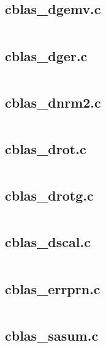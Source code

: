 \documentclass{article}
\begin{document}
\subsection{cblas\_dgemv.c}
\inputminted{c}{/home/dufferzafar/dev/@clones/scikit-learn/sklearn/src/cblas/cblas_dgemv.c}
\newpage

\subsection{cblas\_dger.c}
\inputminted{c}{/home/dufferzafar/dev/@clones/scikit-learn/sklearn/src/cblas/cblas_dger.c}
\newpage

\subsection{cblas\_dnrm2.c}
\inputminted{c}{/home/dufferzafar/dev/@clones/scikit-learn/sklearn/src/cblas/cblas_dnrm2.c}
\newpage

\subsection{cblas\_drot.c}
\inputminted{c}{/home/dufferzafar/dev/@clones/scikit-learn/sklearn/src/cblas/cblas_drot.c}
\newpage

\subsection{cblas\_drotg.c}
\inputminted{c}{/home/dufferzafar/dev/@clones/scikit-learn/sklearn/src/cblas/cblas_drotg.c}
\newpage

\subsection{cblas\_dscal.c}
\inputminted{c}{/home/dufferzafar/dev/@clones/scikit-learn/sklearn/src/cblas/cblas_dscal.c}
\newpage

\subsection{cblas\_errprn.c}
\inputminted{c}{/home/dufferzafar/dev/@clones/scikit-learn/sklearn/src/cblas/cblas_errprn.c}
\newpage

\subsection{cblas\_sasum.c}
\inputminted{c}{/home/dufferzafar/dev/@clones/scikit-learn/sklearn/src/cblas/cblas_sasum.c}
\newpage
\end{document}
